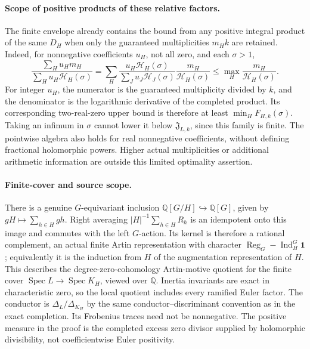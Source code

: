 \paragraph{Scope of positive products of these relative factors.}
The finite envelope already contains the bound from
any positive integral product of the same \(D_H\)
when only the guaranteed multiplicities \(m_Hk\)
are retained. Indeed, for nonnegative coefficients
\(u_H\), not all zero, and each \(\sigma>1\),
\[
 \frac{\sum_Hu_Hm_H}{\sum_Hu_H\mathscr H_H(\sigma)}
 =\sum_H
   \frac{u_H\mathscr H_H(\sigma)}
        {\sum_Ju_J\mathscr H_J(\sigma)}
             \frac{m_H}{\mathscr H_H(\sigma)}
 \le\max_H\frac{m_H}{\mathscr H_H(\sigma)}.
\]
For integer \(u_H\), the numerator is the guaranteed
multiplicity divided by \(k\), and the denominator is
the logarithmic derivative of the completed product.
Its corresponding two-real-zero upper bound is
therefore at least \(\min_H F_{H,k}(\sigma)\).
Taking an infimum in \(\sigma\) cannot lower it
below \(\mathfrak J_{L,k}\), since this family is
finite. The pointwise algebra also holds for real
nonnegative coefficients, without defining fractional
holomorphic powers. Higher actual multiplicities or
additional arithmetic information are outside this
limited optimality assertion.

\paragraph{Finite-cover and source scope.}
There is a genuine \(G\)-equivariant inclusion
\(\mathbb Q[G/H]\hookrightarrow\mathbb Q[G]\),
given by \(gH\mapsto\sum_{h\in H}gh\).
Right averaging
\(|H|^{-1}\sum_{h\in H}R_h\) is an idempotent
onto this image and commutes with the left \(G\)-action.
Its kernel is therefore a rational complement, an actual
finite Artin representation with character
\(\operatorname{Reg}_G-\operatorname{Ind}_H^G\mathbf1\);
equivalently it is the induction from \(H\) of
the augmentation representation of \(H\).
This describes the degree-zero-cohomology
Artin-motive quotient for the finite cover
\(\operatorname{Spec}L\to\operatorname{Spec}K_H\),
viewed over \(\mathbb Q\). Inertia invariants are
exact in characteristic zero, so the local
quotient includes every ramified Euler factor.
The conductor is \(\Delta_L/\Delta_{K_H}\) by
the same conductor--discriminant convention as
in the exact completion. Its Frobenius traces
need not be nonnegative. The positive measure
in the proof is the completed excess zero
divisor supplied by holomorphic divisibility,
not coefficientwise Euler positivity.

